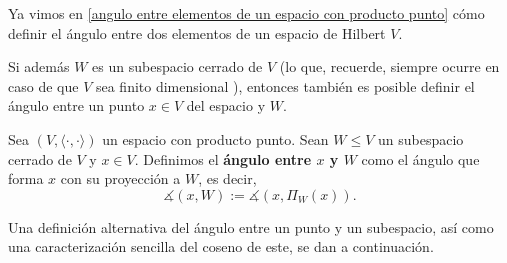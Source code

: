 Ya vimos en \ref{angulo entre elementos de un espacio con producto punto}
cómo definir el ángulo entre dos elementos de un espacio
de Hilbert $V$.

Si además $W$ es un subespacio cerrado de $V$
(lo que, recuerde, siempre ocurre en caso de que
$V$ sea finito dimensional ), entonces también
es posible definir el ángulo entre un punto $x \in V$
del espacio y $W$.

\begin{defi} \label{def: angulo punto subespacio}
Sea $(V, \langle \cdot , \cdot \rangle)$ un espacio con 
producto punto. Sean $W \leq V$ un subespacio cerrado de $V$
y $x \in V$. Definimos el \textbf{ángulo entre $x$ y $W$}
como el ángulo que forma 
$x$ con su proyección a $W$, es decir,
\[
\measuredangle (x, W):= \measuredangle(x, \Pi_{W}(x)).
\]
\end{defi}

Una definición alternativa del ángulo entre un punto y un subespacio,
así como una caracterización sencilla del coseno de este,
se dan a continuación.

